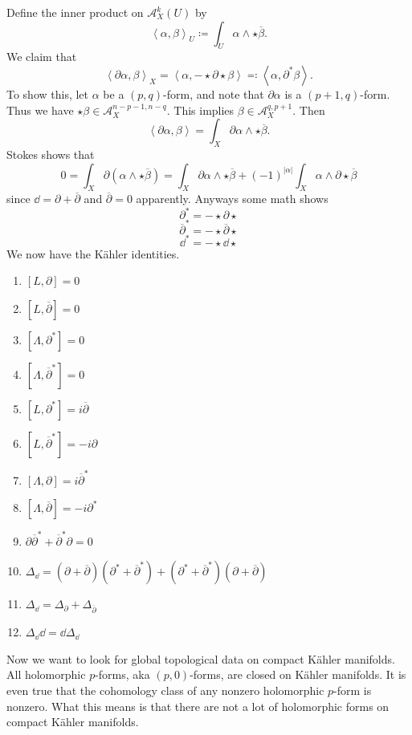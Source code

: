 
Define the inner product on $\mathcal{A} ^k_X(U)$ by
\[
	\left\langle \alpha ,\beta  \right\rangle_U \coloneqq \int_{U} \alpha \wedge \star \overline{\beta } 
.\]
We claim that
\[
	\left\langle \partial \alpha ,\beta  \right\rangle_X = \left\langle \alpha , -\star \partial \star \beta  \right\rangle \eqqcolon \left\langle \alpha , \partial ^* \beta  \right\rangle 
.\]
To show this, let $\alpha $ be a $(p,q)$-form, and note that $\partial \alpha $ is a $(p+1,q)$-form. Thus we have $\star \beta \in \mathcal{A} ^{n-p-1,n-q}_X$. This implies $\beta \in \mathcal{A} _X^{q,p+1} $. Then
\[
	\left\langle \partial \alpha ,\beta  \right\rangle =\int_{X} \partial \alpha \wedge \star \overline{\beta } 
.\]
Stokes shows that
\[
	0 = \int_{X} \partial (\alpha \wedge \star \overline{\beta } ) = \int_{X} \partial \alpha \wedge \star \overline{\beta } + (-1)^{\left| \alpha  \right| } \int_{X} \alpha \wedge \partial \star \overline{\beta } 
\]
since $\dd =\partial + \overline{\partial }$ and $\overline{\partial } =0$ apparently. Anyways some math shows
\[
	\partial ^* = -\star \partial \star 
\]
\[
	\overline{\partial } ^* = -\star \overline{\partial } \star 
\]
\[
	\dd ^* = -\star \dd \star 
\]
We now have the K\"ahler identities.

\begin{enumerate}
	\item $[L,\partial ]=0$
	\item $[L,  \overline{\partial } ]=0$
	\item $[\Lambda ,\partial ^*]=0$
	\item $[\Lambda , \overline{\partial } ^*]=0$
	\item $[L,\partial ^*]=i \overline{\partial } $
	\item $[L, \overline{\partial } ^*]=-i \partial $
	\item $[\Lambda ,\partial ]=i \overline{\partial } ^*$
	\item $[\Lambda , \overline{\partial }]=-i \partial ^*$
	\item $\partial \overline{\partial } ^* + \overline{\partial } ^* \partial =0$
	\item $\Delta_{\dd } = (\partial +\overline{\partial } )(\partial ^* + \overline{\partial } ^*) + (\partial ^* +\overline{\partial } ^*)(\partial + \overline{\partial } )$
	\item $\Delta _{\dd } =\Delta _{\partial } +\Delta _{\overline{\partial } } $
	\item $\Delta _{\dd } \dd =\dd \Delta _{\dd } $
\end{enumerate}

Now we want to look for global topological data on compact K\"ahler manifolds. All holomorphic $p$-forms, aka $(p,0)$-forms, are closed on K\"ahler manifolds. It is even true that the cohomology class of any nonzero holomorphic $p$-form is nonzero. What this means is that there are not a lot of holomorphic forms on compact K\"ahler manifolds.





